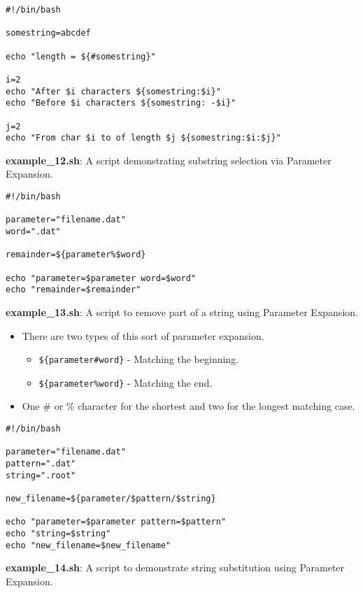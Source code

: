 \documentclass[17pt,dvips]{foils}
\begin{document}
\begin{verbatim}
#!/bin/bash

somestring=abcdef

echo "length = ${#somestring}"
   
i=2
echo "After $i characters ${somestring:$i}"   
echo "Before $i characters ${somestring: -$i}"
   
j=2
echo "From char $i to of length $j ${somestring:$i:$j}"
\end{verbatim}
{\bf example\_12.sh}: A script demonstrating substring selection via Parameter Expansion.


\begin{verbatim}
#!/bin/bash

parameter="filename.dat"
word=".dat"

remainder=${parameter%$word}

echo "parameter=$parameter word=$word"
echo "remainder=$remainder"
\end{verbatim}
{\bf example\_13.sh}: A script to remove part of a string using Parameter Expansion.

\begin{itemize}
\item There are two types of this sort of parameter expansion.
\begin{itemize}
  \item \texttt{\$\{parameter\#word\}} - Matching the beginning.
  \item \texttt{\$\{parameter\%word\}} - Matching the end.
\end{itemize}
\item One \# or \% character for the shortest and two for the longest matching case.
\end{itemize}


\begin{verbatim}
#!/bin/bash

parameter="filename.dat"
pattern=".dat"
string=".root"

new_filename=${parameter/$pattern/$string}

echo "parameter=$parameter pattern=$pattern"
echo "string=$string"
echo "new_filename=$new_filename"
\end{verbatim}
{\bf example\_14.sh}: A script to demonstrate string substitution using Parameter Expansion.
\end{document}
